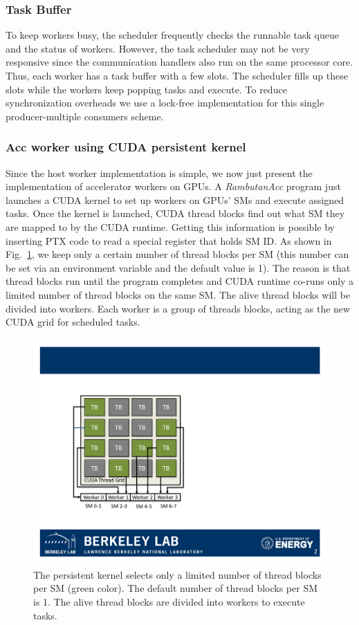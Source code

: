 \subsubsection{Task Buffer}
To keep workers busy, the scheduler frequently checks the runnable task queue and the status of workers.
However, the task scheduler may not be very responsive since the communication handlers also run on the same processor core.
Thus, each worker has a task buffer with a few slots.
The scheduler fills up these slots while the workers keep popping tasks and execute.
To reduce synchronization overheads we use a lock-free implementation for this single producer-multiple consumers scheme.

\subsubsection{Acc worker using CUDA persistent kernel}
Since the host worker implementation is simple, we now just present the implementation of accelerator workers on GPUs.
A {\em RambutanAcc} program just launches a CUDA kernel to set up workers on GPUs' SMs and execute assigned tasks.
Once the kernel is launched, CUDA thread blocks find out what SM they are mapped to by the CUDA runtime.
Getting this information is possible by inserting PTX code to read a special register that holds SM ID.
As shown in Fig.~\ref{fig:kernel}, we keep only a certain number of thread blocks per SM (this number can be set via an environment variable and the default value is 1).
The reason is that thread blocks run until the program completes and CUDA runtime co-runs only a limited number of thread blocks on the same SM.
The alive thread blocks will be divided into workers.
Each worker is a group of threads blocks, acting as the new CUDA grid for scheduled tasks.

\begin{figure}[htb]
\centering
\includegraphics[width=.35\textwidth]{figures/kernel_init.pdf}
\caption{The persistent kernel selects only a limited number of thread blocks per SM (green color). The default number of thread blocks per SM is 1. 
The alive thread blocks are divided into workers to execute tasks.}
\label{fig:kernel}
\end{figure}

